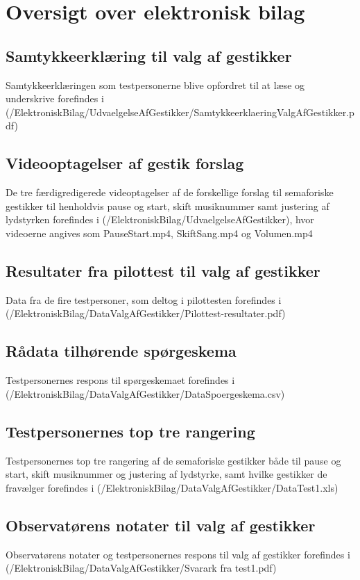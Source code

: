 \chapter{Oversigt over elektronisk bilag}
\label{app:OversigtOverElektroniskBilag}
%
%
\section{Samtykkeerklæring til valg af gestikker}
\label{app:SamtykkeerklaeringValgAfGestikker}
%
Samtykkeerklæringen som testpersonerne blive opfordret til at læse og underskrive forefindes i (/ElektroniskBilag/UdvaelgelseAfGestikker/SamtykkeerklaeringValgAfGestikker.pdf)
%
\section{Videooptagelser af gestik forslag}
\label{app:VideooptagelseGestikForslag}
%
De tre færdigredigerede videoptagelser af de forskellige forslag til semaforiske gestikker til henholdvis pause og start, skift musiknummer samt justering af lydstyrken forefindes i (/ElektroniskBilag/UdvaelgelseAfGestikker), hvor videoerne angives som PauseStart.mp4, SkiftSang.mp4 og Volumen.mp4
%
\section{Resultater fra pilottest til valg af gestikker}
\label{app:ResultaterPilottestValgAfGestikker}
%
Data fra de fire testpersoner, som deltog i pilottesten forefindes i \\
(/ElektroniskBilag/DataValgAfGestikker/Pilottest-resultater.pdf)
%
\section{Rådata tilhørende spørgeskema}
\label{app:RaaDataSpoergeskema}
%
Testpersonernes respons til spørgeskemaet forefindes i (/ElektroniskBilag/DataValgAfGestikker/DataSpoergeskema.csv)
%
\section{Testpersonernes top tre rangering}
\label{app:TestpersonernesTopTre}
%
Testpersonernes top tre rangering af de semaforiske gestikker både til pause og start, skift musiknummer og justering af lydstyrke, samt hvilke gestikker de fravælger forefindes i (/ElektroniskBilag/DataValgAfGestikker/DataTest1.xls)
%
\section{Observatørens notater til valg af gestikker}
\label{app:NoterValgAfGestikker}
%
Observatørens notater og testpersonernes respons til valg af gestikker forefindes i (/ElektroniskBilag/DataValgAfGestikker/Svarark fra test1.pdf)
%
